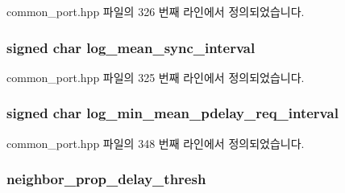 common\+\_\+port.\+hpp 파일의 326 번째 라인에서 정의되었습니다.

\subsubsection[{\texorpdfstring{log\+\_\+mean\+\_\+sync\+\_\+interval}{log_mean_sync_interval}}]{\setlength{\rightskip}{0pt plus 5cm}signed char log\+\_\+mean\+\_\+sync\+\_\+interval\hspace{0.3cm}{\ttfamily [private]}}\hypertarget{class_common_port_ae72fee092f86e98847d8872b9fc5c1d5}{}\label{class_common_port_ae72fee092f86e98847d8872b9fc5c1d5}


common\+\_\+port.\+hpp 파일의 325 번째 라인에서 정의되었습니다.

\subsubsection[{\texorpdfstring{log\+\_\+min\+\_\+mean\+\_\+pdelay\+\_\+req\+\_\+interval}{log_min_mean_pdelay_req_interval}}]{\setlength{\rightskip}{0pt plus 5cm}signed char log\+\_\+min\+\_\+mean\+\_\+pdelay\+\_\+req\+\_\+interval\hspace{0.3cm}{\ttfamily [private]}}\hypertarget{class_common_port_aed81f7b57d71924797a6ffa400455feb}{}\label{class_common_port_aed81f7b57d71924797a6ffa400455feb}


common\+\_\+port.\+hpp 파일의 348 번째 라인에서 정의되었습니다.

\subsubsection[{\texorpdfstring{neighbor\+\_\+prop\+\_\+delay\+\_\+thresh}{neighbor_prop_delay_thresh}}]{ neighbor\+\_\+prop\+\_\+delay\+\_\+thresh\hspace{0.3cm}{\ttfamily [private]}}\hypertarget{class_common_port_ae6ecdaaf6ed26528bbb672556516bde4}{}\label{class_common_port_ae6ecdaaf6ed26528bbb672556516bde4}


